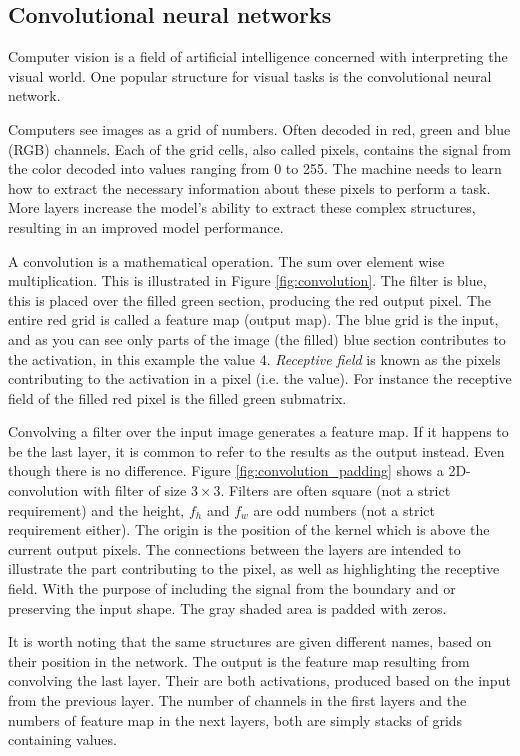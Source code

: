 \documentclass{article}
\begin{document}
\subsection{Convolutional neural networks} \label{sec:convolutional neural network}
Computer vision is a field of artificial intelligence concerned with interpreting the visual world. One popular structure for visual tasks is the convolutional neural network. %

Computers see images as a grid of numbers. Often decoded in red, green and blue (RGB) channels. Each of the grid cells, also called pixels, contains the signal from the color decoded into values ranging from 0 to 255. The machine needs to learn how to extract the necessary information about these pixels to perform a task. More layers increase the model's ability to extract these complex structures, resulting in an improved model performance. 

A convolution is a mathematical operation. The sum over element wise multiplication. This is illustrated in Figure \ref{fig:convolution}. The filter is blue, this is placed over the filled green section, producing the red output pixel. The entire red grid is called a feature map (output map). The blue grid is the input, and as you can see only parts of the image (the filled) blue section contributes to the activation, in this example the value 4. \textit{Receptive field} is known as the pixels contributing to the activation in a pixel (i.e. the value). For instance the receptive field of the filled red pixel is the filled green submatrix.


Convolving a filter over the input image generates a feature map. If it happens to be the last layer, it is common to refer to the results as the output instead. Even though there is no difference. Figure \ref{fig:convolution_padding} shows a 2D-convolution with filter of size $3\times 3$. Filters are often square (not a strict requirement) and the height, $f_h$ and $f_w$ are odd numbers (not a strict requirement either). The origin is the position of the kernel which is above the current output pixels. The connections between the layers are intended to illustrate the part contributing to the pixel, as well as highlighting the receptive field. With the purpose of including the signal from the boundary and or preserving the input shape. The gray shaded area is padded with zeros. 

It is worth noting that the same structures are given different names, based on their position in the network. The output is the feature map resulting from convolving the last layer. Their are both activations, produced based on the input from the previous layer. The number of channels in the first layers and the numbers of feature map in the next layers, both are simply stacks of grids containing values.
\end{document}
